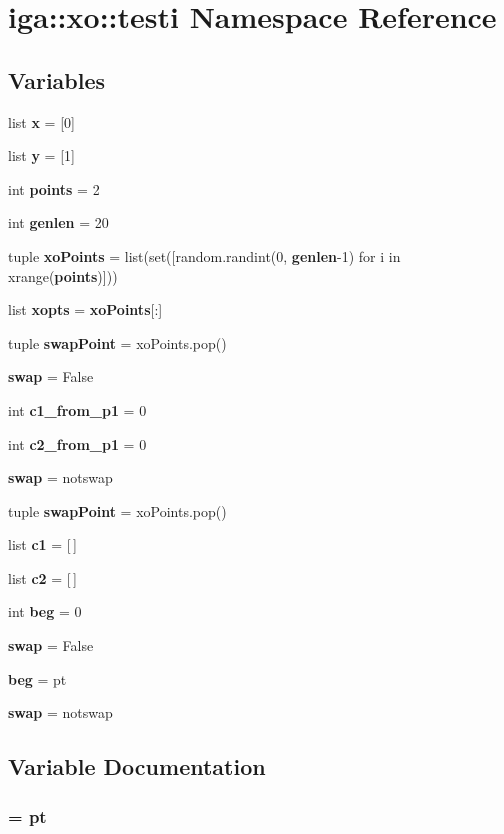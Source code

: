 \section{iga::xo::testi Namespace Reference}
\label{namespaceiga_1_1xo_1_1testi}


\subsection*{Variables}
\begin{CompactItemize}
\item 
list {\bf x} = [0]
\item 
list {\bf y} = [1]
\item 
int {\bf points} = 2
\item 
int {\bf genlen} = 20
\item 
tuple {\bf xoPoints} = list(set([random.randint(0, {\bf genlen}-1) for i in xrange({\bf points})]))
\item 
list {\bf xopts} = {\bf xoPoints}[:]
\item 
tuple {\bf swapPoint} = xoPoints.pop()
\item 
{\bf swap} = False
\item 
int {\bf c1\_\-from\_\-p1} = 0
\item 
int {\bf c2\_\-from\_\-p1} = 0
\item 
{\bf swap} = notswap
\item 
tuple {\bf swapPoint} = xoPoints.pop()
\item 
list {\bf c1} = [$\,$]
\item 
list {\bf c2} = [$\,$]
\item 
int {\bf beg} = 0
\item 
{\bf swap} = False
\item 
{\bf beg} = pt
\item 
{\bf swap} = notswap
\end{CompactItemize}


\subsection{Variable Documentation}
\subsubsection{ = pt\hspace{0.3cm}{\tt  [static]}}\label{namespaceiga_1_1xo_1_1testi_9a13a8d13db0e78d571584032f14befb}





